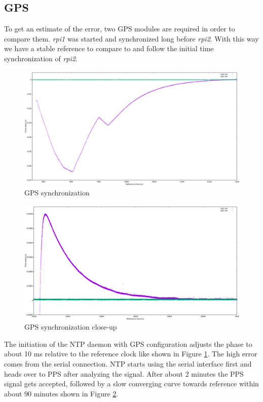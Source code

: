 \subsection{GPS}

To get an estimate of the error, two GPS modules are required in order to compare them. \textit{rpi1} was started and synchronized long before \textit{rpi2}. With this way we have a stable reference to compare to and follow the initial time synchronization of \textit{rpi2}.

\begin{figure}[H]
	\centering
	\includegraphics[width=1.0\textwidth]{figures/plot_gps1.png}
	\caption{GPS synchronization}
	\label{fig:plot_gps1}
\end{figure}

\begin{figure}[H]
	\centering
	\includegraphics[width=1.0\textwidth]{figures/plot_gps2.png}
	\caption{GPS synchronization close-up}
	\label{fig:plot_gps2}
\end{figure}

The initiation of the NTP daemon with GPS configuration adjusts the phase to about 10 ms relative to the reference clock like shown in Figure \ref{fig:plot_gps1}. The high error comes from the serial connection. NTP starts using the serial interface first and heads over to PPS after analyzing the signal. After about 2 minutes the PPS signal gets accepted, followed by a slow converging curve towards reference within about 90 minutes shown in Figure \ref{fig:plot_gps2}.

